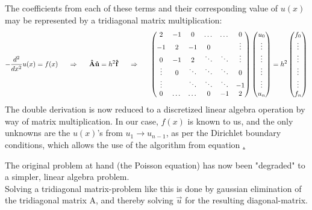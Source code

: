 \documentclass[11pt,a4paper,notitlepage]{article}
\begin{document}
The coefficients from each of these terms and their corresponding value of $u(x)$ may be represented by a tridiagonal matrix multiplication:
\begin{align*}
-\frac{d^2}{dx^2}u(x) = f(x) \indent \Rightarrow \indent \mathbf{\hat{A}}\mathbf{\hat{u}} = h^2\mathbf{\hat{f}} \indent \Rightarrow \indent \left(\begin{matrix}
  2     & -1     & 0      & \dots  & \dots  & 0      \\
 -1     &  2     & -1     & 0      &        & \vdots \\
  0     & -1     &  2     & \ddots & \ddots & \vdots \\
 \vdots & 0      & \ddots & \ddots & \ddots & 0      \\
 \vdots &        & \ddots & \ddots & \ddots & -1     \\
  0     & \dots  & \dots  & 0      & -1     & 2      \\
\end{matrix}\right) \left(\begin{matrix}
u_0 \\
\vdots\\
\vdots\\
\vdots\\
\vdots\\
u_n \\
\end{matrix}\right) = h^2\left(\begin{matrix}
f_0 \\
\vdots\\
\vdots\\
\vdots\\
\vdots\\
f_n \\
\end{matrix}\right)
\end{align*}
The double derivation is now reduced to a discretized linear algebra  operation by way of matrix multiplication. In our case, $f(x)$ is known to us, and the only unknowns are the $u(x)$'s from $u_1 \rightarrow u_{n-1}$, as per the Dirichlet boundary conditions, which allows the use of the algorithm from equation \href{eq:2}.

The original problem at hand (the Poisson equation) has now been "degraded" to a simpler, linear algebra problem. \\
Solving a tridiagonal matrix-problem like this is done by gaussian elimination of the tridiagonal matrix A, and thereby solving $\vec{u}$ for the resulting diagonal-matrix. \\
\end{document}
